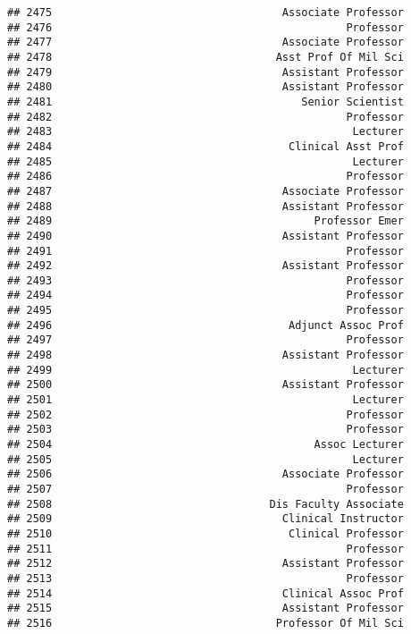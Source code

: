 \documentclass[
]{article}
\begin{document}
\begin{verbatim}
## 2475                                    Associate Professor
## 2476                                              Professor
## 2477                                    Associate Professor
## 2478                                   Asst Prof Of Mil Sci
## 2479                                    Assistant Professor
## 2480                                    Assistant Professor
## 2481                                       Senior Scientist
## 2482                                              Professor
## 2483                                               Lecturer
## 2484                                     Clinical Asst Prof
## 2485                                               Lecturer
## 2486                                              Professor
## 2487                                    Associate Professor
## 2488                                    Assistant Professor
## 2489                                         Professor Emer
## 2490                                    Assistant Professor
## 2491                                              Professor
## 2492                                    Assistant Professor
## 2493                                              Professor
## 2494                                              Professor
## 2495                                              Professor
## 2496                                     Adjunct Assoc Prof
## 2497                                              Professor
## 2498                                    Assistant Professor
## 2499                                               Lecturer
## 2500                                    Assistant Professor
## 2501                                               Lecturer
## 2502                                              Professor
## 2503                                              Professor
## 2504                                         Assoc Lecturer
## 2505                                               Lecturer
## 2506                                    Associate Professor
## 2507                                              Professor
## 2508                                  Dis Faculty Associate
## 2509                                    Clinical Instructor
## 2510                                     Clinical Professor
## 2511                                              Professor
## 2512                                    Assistant Professor
## 2513                                              Professor
## 2514                                    Clinical Assoc Prof
## 2515                                    Assistant Professor
## 2516                                   Professor Of Mil Sci

\end{verbatim}
\end{document}
